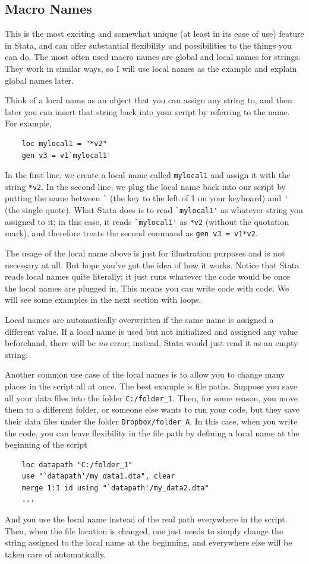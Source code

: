 \subsection{Macro Names} This is the most exciting and somewhat unique (at least in its ease of use) feature in Stata, and can offer substantial flexibility and possibilities to the things you can do. The most often used macro names are global and local names for strings. They work in similar ways, so I will use local names as the example and explain global names later. 

Think of a local name as an object that you can assign any string to, and then later you can insert that string back into your script by referring to the name. For example,
\begin{verbatim}
    loc mylocal1 = "*v2"
    gen v3 = v1`mylocal1'
\end{verbatim}
In the first line, we create a local name called \verb|mylocal1| and assign it with the string \verb|*v2|. In the second line, we plug the local name back into our script by putting the name between \verb|`| (the key to the left of 1 on your keyboard) and \verb|'| (the single quote). What Stata does is to read \verb|`mylocal1'| as whatever string you assigned to it; in this case, it reads \verb|`mylocal1'| as \verb|*v2| (without the quotation mark), and therefore treats the second command as \verb|gen v3 = v1*v2|. 

The usage of the local name above is just for illustration purposes and is not necessary at all. But hope you've got the idea of how it works. Notice that Stata reads local names quite literally; it just runs whatever the code would be once the local names are plugged in. This means you can write code with code. We will see some examples in the next section with loops. 

Local names are automatically overwritten if the same name is assigned a different value. If a local name is used but not initialized and assigned any value beforehand, there will be \textit{no} error; instead, Stata would just read it as an empty string. 

Another common use case of the local names is to allow you to change many places in the script all at once. The best example is file paths. Suppose you save all your data files into the folder \verb|C:/folder_1|. Then, for some reason, you move them to a different folder, or someone else wants to run your code, but they save their data files under the folder \verb|Dropbox/folder_A|. In this case, when you write the code, you can leave flexibility in the file path by defining a local name at the beginning of the script
\begin{verbatim}
    loc datapath "C:/folder_1"
    use "`datapath'/my_data1.dta", clear 
    merge 1:1 id using "`datapath'/my_data2.dta"
    ... 
\end{verbatim}
And you use the local name instead of the real path everywhere in the script. Then, when the file location is changed, one just needs to simply change the string assigned to the local name at the beginning, and everywhere else will be taken care of automatically.

